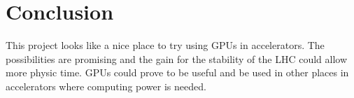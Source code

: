 \documentclass[a4paper]{article}
\begin{document}
\section{Conclusion}

This project looks like a nice place to try using \glspl{GPU} in accelerators.
The possibilities are promising and the gain for the stability of the 
\gls{LHC} could allow more physic time. \Glspl{GPU} could prove to be useful
and be used in other places in accelerators where computing power is needed.

\printglossaries

\clearpage



\end{document}
